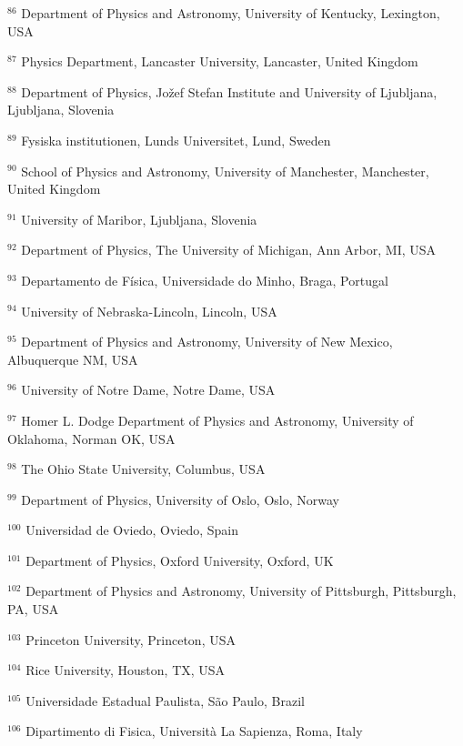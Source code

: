 \par {\footnotesize $^{86}$ Department of Physics and Astronomy, University of Kentucky, Lexington, USA}
\par {\footnotesize $^{87}$ Physics Department, Lancaster University, Lancaster, United Kingdom}
\par {\footnotesize $^{88}$ Department of Physics, Jožef Stefan Institute and University of Ljubljana, Ljubljana, Slovenia}
\par {\footnotesize $^{89}$ Fysiska institutionen, Lunds Universitet, Lund, Sweden}
\par {\footnotesize $^{90}$ School of Physics and Astronomy, University of Manchester, Manchester, United Kingdom}
\par {\footnotesize $^{91}$ University of Maribor, Ljubljana, Slovenia}
\par {\footnotesize $^{92}$ Department of Physics, The University of Michigan, Ann Arbor, MI, USA}
\par {\footnotesize $^{93}$ Departamento de Física, Universidade do Minho, Braga, Portugal}
\par {\footnotesize $^{94}$ University of Nebraska-Lincoln, Lincoln, USA}
\par {\footnotesize $^{95}$ Department of Physics and Astronomy, University of New Mexico, Albuquerque NM, USA}
\par {\footnotesize $^{96}$ University of Notre Dame, Notre Dame, USA}
\par {\footnotesize $^{97}$ Homer L. Dodge Department of Physics and Astronomy, University of Oklahoma, Norman OK, USA}
\par {\footnotesize $^{98}$ The Ohio State University, Columbus, USA}
\par {\footnotesize $^{99}$ Department of Physics, University of Oslo, Oslo, Norway}
\par {\footnotesize $^{100}$ Universidad de Oviedo, Oviedo, Spain}
\par {\footnotesize $^{101}$ Department of Physics, Oxford University, Oxford, UK}
\par {\footnotesize $^{102}$ Department of Physics and Astronomy, University of Pittsburgh, Pittsburgh, PA, USA}
\par {\footnotesize $^{103}$ Princeton University, Princeton, USA}
\par {\footnotesize $^{104}$ Rice University, Houston, TX, USA}
\par {\footnotesize $^{105}$ Universidade Estadual Paulista, São Paulo, Brazil}
\par {\footnotesize $^{106}$ Dipartimento di Fisica, Università La Sapienza, Roma, Italy}
